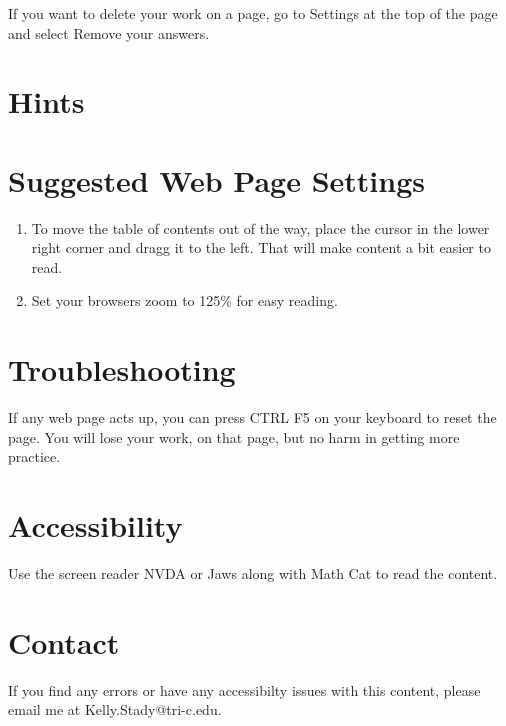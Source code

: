 \documentclass{ximera}[font=12pt]
\begin{document}
If you want to delete your work on a page, go to Settings at the top of the page and select Remove your answers.  


\section*{Hints}



\section*{Suggested Web Page Settings}

\begin{enumerate}
\item To move the table of contents out of the way, place the cursor in the lower right corner and dragg it to the left.  That will make 
content a bit easier to read. 

\item Set your browsers zoom to 125\% for easy reading.  
\end{enumerate}

\section*{Troubleshooting}

If any web page acts up, you can press CTRL F5 on your keyboard to reset the page.  You will lose your work, on that page, 
but no harm in getting more practice. 


\section*{Accessibility}

Use the screen reader NVDA or Jaws along with Math Cat to read the content.

\section*{Contact}

If you find any errors or have any accessibilty issues with this content, please email me at Kelly.Stady@tri-c.edu.
\end{document}
